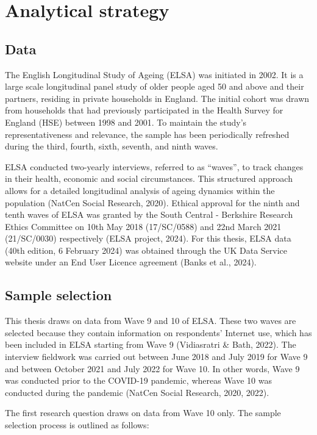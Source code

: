 \chapter{\label{ch:4-strategy}Analytical strategy}

\section{Data}
The English Longitudinal Study of Ageing (ELSA) was initiated in 2002. It is a large scale longitudinal panel study of older people aged 50 and above and their partners, residing in private households in England. The initial cohort was drawn from households that had previously participated in the Health Survey for England (HSE) between 1998 and 2001. To maintain the study's representativeness and relevance, the sample has been periodically refreshed during the third, fourth, sixth, seventh, and ninth waves. 

ELSA conducted two-yearly interviews, referred to as ``waves”, to track changes in their health, economic and social circumstances. This structured approach allows for a detailed longitudinal analysis of ageing dynamics within the population (NatCen Social Research, 2020). Ethical approval for the ninth and tenth waves of ELSA was granted by the South Central - Berkshire Research Ethics Committee on 10th May 2018 (17/SC/0588) and 22nd March 2021 (21/SC/0030) respectively (ELSA project, 2024). For this thesis, ELSA data (40th edition, 6 February 2024) was obtained through the UK Data Service website under an End User Licence agreement (Banks et al., 2024). 

\section{Sample selection}
This thesis draws on data from Wave 9 and 10 of ELSA. These two waves are selected because they contain information on respondents' Internet use, which has been included in ELSA starting from Wave 9 (Vidiasratri \& Bath, 2022). The interview fieldwork was carried out between June 2018 and July 2019 for Wave 9 and between October 2021 and July 2022 for Wave 10. In other words, Wave 9 was conducted prior to the COVID-19 pandemic, whereas Wave 10 was conducted during the pandemic (NatCen Social Research, 2020, 2022). 

The first research question draws on data from Wave 10 only. The sample selection process is outlined as follows:

